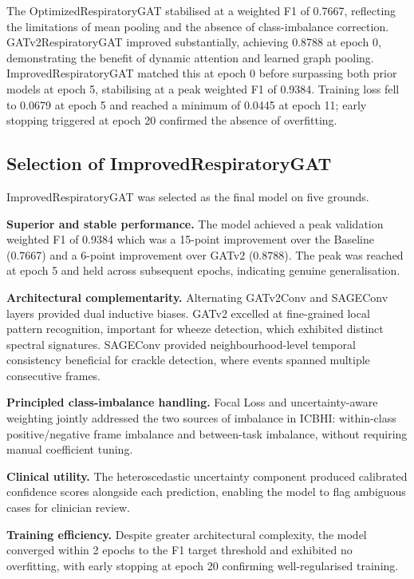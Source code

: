 The OptimizedRespiratoryGAT stabilised at a weighted F1 of 0.7667, reflecting
the limitations of mean pooling and the absence of class-imbalance
correction. GATv2RespiratoryGAT improved substantially, achieving 0.8788
at epoch 0, demonstrating the benefit of dynamic attention and learned
graph pooling. ImprovedRespiratoryGAT matched this at epoch 0 before
surpassing both prior models at epoch 5, stabilising at a peak
weighted F1 of 0.9384. Training loss fell to 0.0679 at epoch 5 and
reached a minimum of 0.0445 at epoch 11; early stopping triggered at
epoch 20 confirmed the absence of overfitting.

\subsection{Selection of ImprovedRespiratoryGAT}

ImprovedRespiratoryGAT was selected as the final model on five grounds.

\textbf{Superior and stable performance.} The model achieved a peak
validation weighted F1 of 0.9384 which was a 15-point improvement over the
Baseline (0.7667) and a 6-point improvement over GATv2 (0.8788).
The peak was reached at epoch 5 and held across subsequent epochs,
indicating genuine generalisation.

\textbf{Architectural complementarity.} Alternating GATv2Conv and
SAGEConv layers provided dual inductive biases. GATv2 excelled at
fine-grained local pattern recognition, important for wheeze detection,
which exhibited distinct spectral signatures. SAGEConv provided
neighbourhood-level temporal consistency beneficial for crackle
detection, where events spanned multiple consecutive frames.

\textbf{Principled class-imbalance handling.} Focal Loss and
uncertainty-aware weighting jointly addressed the two sources of
imbalance in ICBHI: within-class positive/negative frame imbalance
and between-task imbalance, without requiring manual coefficient tuning.

\textbf{Clinical utility.} The heteroscedastic uncertainty component
produced calibrated confidence scores alongside each prediction,
enabling the model to flag ambiguous cases for clinician review.

\textbf{Training efficiency.} Despite greater architectural complexity,
the model converged within 2 epochs to the F1 target threshold and
exhibited no overfitting, with early stopping at epoch 20 confirming
well-regularised training.

